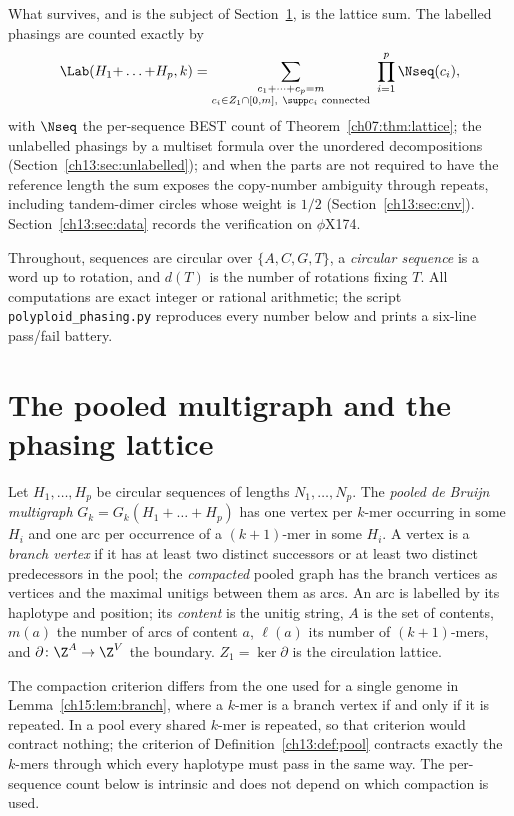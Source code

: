 What survives, and is the subject of Section~\ref{ch13:sec:lattice}, is the lattice sum. The
labelled phasings are counted exactly by
\[
  \Lab(H_1{+}\dots{+}H_p,k)=\sum_{\substack{c_1+\dots+c_p=m\\ c_i\in Z_1\cap[0,m],\ \supp c_i
  \text{ connected}}}\ \prod_{i=1}^p\Nseq(c_i),
\]
with $\Nseq$ the per-sequence BEST count of Theorem~\ref{ch07:thm:lattice}; the unlabelled phasings by a multiset
formula over the unordered decompositions (Section~\ref{ch13:sec:unlabelled}); and when the parts
are not required to have the reference length the sum exposes the copy-number ambiguity
through repeats, including tandem-dimer circles whose weight is $1/2$ (Section~\ref{ch13:sec:cnv}).
Section~\ref{ch13:sec:data} records the verification on $\phi$X174.

Throughout, sequences are circular over $\{A,C,G,T\}$, a \emph{circular sequence} is a word
up to rotation, and $d(T)$ is the number of rotations fixing $T$. All computations are exact
integer or rational arithmetic; the script \texttt{polyploid\_phasing.py} reproduces every
number below and prints a six-line pass/fail battery.

\section{The pooled multigraph and the phasing lattice}\label{ch13:sec:lattice}

\begin{definition}\label{ch13:def:pool}
Let $H_1,\dots,H_p$ be circular sequences of lengths $N_1,\dots,N_p$. The \emph{pooled de
Bruijn multigraph} $G_k=G_k(H_1{+}\dots{+}H_p)$ has one vertex per $k$-mer occurring in some
$H_i$ and one arc per occurrence of a $(k{+}1)$-mer in some $H_i$. A vertex is a \emph{branch
vertex} if it has at least two distinct successors or at least two distinct predecessors in
the pool; the \emph{compacted} pooled graph has the branch vertices as vertices and the
maximal unitigs between them as arcs. An arc is labelled by its haplotype and position; its
\emph{content} is the unitig string, $A$ is the set of contents, $m(a)$ the number of arcs of
content $a$, $\ell(a)$ its number of $(k{+}1)$-mers, and $\partial\colon\Z^A\to\Z^V$ the
boundary. $Z_1=\ker\partial$ is the circulation lattice.
\end{definition}

The compaction criterion differs from the one used for a single genome in Lemma~\ref{ch15:lem:branch}, where a
$k$-mer is a branch vertex if and only if it is repeated. In a pool every shared $k$-mer is
repeated, so that criterion would contract nothing; the criterion of
Definition~\ref{ch13:def:pool} contracts exactly the $k$-mers through which every haplotype must
pass in the same way. The per-sequence count below is intrinsic and does not depend on which
compaction is used.

